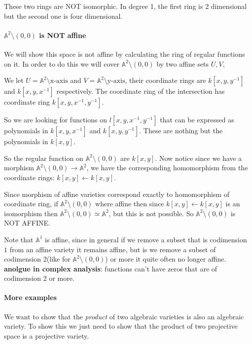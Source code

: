 These two rings are NOT isomorphic. In degree 1, the first ring is 2 dimensional but the second one is four dimensional.

\paragraph*{$\mathbb{A}^2\setminus (0,0)$ is NOT affine}
We will show this space is not affine by calculating the ring of regular functions on it. In order to do this we will cover $\mathbb{A}^2\setminus (0,0)$ by two affine sets $U,V$, 

We let $U=\mathbb{A}^2 \setminus \text{x-axis}$ and $V=\mathbb{A}^2 \setminus \text{y-axis}$, their coordinate rings are $k[x,y,y^{-1}]$ and $k[x,y,x^{-1}]$ respectively. The coordinate ring of the intersection has coordinate ring $k[x,y,x^{-1},y^{-1}]$.

So we are looking for functions on $l[x,y,x^{-1},y^{-1}]$ that can be expressed as polynomials in $k[x,y,x^{-1}]$ and $k[x,y,y^{-1}]$. These are nothing but the polynomials in $k[x,y]$.

So the regular function on $\mathbb{A}^2\setminus (0,0)$ are $k[x,y]$. Now notice since we have a morphism $\mathbb{A}^2\setminus (0,0)\rightarrow \mathbb{A}^2$, we have the corresponding homomorphism from the coordinate rings: $k[x,y]\leftarrow k[x,y]$.

Since morphism of affine varieties correspond exactly to homomorphism of coordinate ring, if $\mathbb{A}^2\setminus (0,0)$ where affine then since $k[x,y]\leftarrow k[x,y]$ is an isomorphism then $\mathbb{A}^2\setminus (0,0)\simeq \mathbb{A}^2$, but this is not possible. So $\mathbb{A}^2\setminus (0,0)$ is NOT AFFINE.

Note that $\mathbb{A}^1$ is affine, since in general if we remove a subset that is codimension $1$ from an affine variety it remains affine, but is we remove a subset of codimension 2(like for $\mathbb{A}^2\setminus (0,0)$) or more it quite often no longer affine. 
\textbf{anolgue in complex analysis}: functions can't have zeros that are of codimension 2 or more.


\paragraph*{More examples}
We want to show that the \textit{product} of two algebraic varieties is also an algebraic variety. To show this we just need to show that the product of two projective space is a projective variety.


